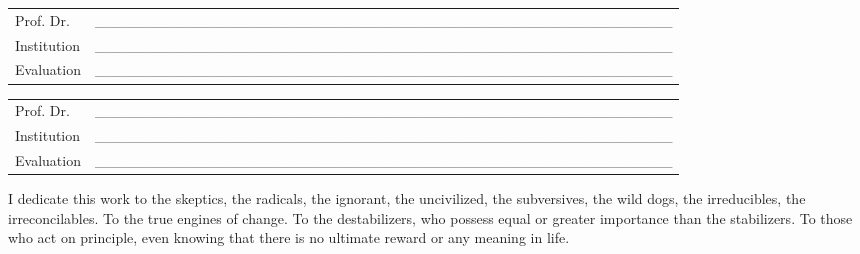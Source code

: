 \documentclass[
  12pt,
  a4paper,
  oneside]{tesesusp}
\begin{document}
\begin{folhadeaprovacao}
  \vspace*{0.5cm}

  \noindent
  \begin{tabular}{m{2cm} P{14cm}}
    Prof. Dr. & \_\_\_\_\_\_\_\_\_\_\_\_\_\_\_\_\_\_\_\_\_\_\_\_\_\_\_\_\_\_\_\_\_\_\_\_\_\_\_\_\_\_\_\_\_\_\_\_\_\_\_\_\_\_\_ \\
    Institution & \_\_\_\_\_\_\_\_\_\_\_\_\_\_\_\_\_\_\_\_\_\_\_\_\_\_\_\_\_\_\_\_\_\_\_\_\_\_\_\_\_\_\_\_\_\_\_\_\_\_\_\_\_\_\_ \\
    Evaluation & \_\_\_\_\_\_\_\_\_\_\_\_\_\_\_\_\_\_\_\_\_\_\_\_\_\_\_\_\_\_\_\_\_\_\_\_\_\_\_\_\_\_\_\_\_\_\_\_\_\_\_\_\_\_\_ \\
  \end{tabular}

  \vspace*{0.5cm}

  \noindent
  \begin{tabular}{m{2cm} P{14cm}}
    Prof. Dr. & \_\_\_\_\_\_\_\_\_\_\_\_\_\_\_\_\_\_\_\_\_\_\_\_\_\_\_\_\_\_\_\_\_\_\_\_\_\_\_\_\_\_\_\_\_\_\_\_\_\_\_\_\_\_\_ \\
    Institution & \_\_\_\_\_\_\_\_\_\_\_\_\_\_\_\_\_\_\_\_\_\_\_\_\_\_\_\_\_\_\_\_\_\_\_\_\_\_\_\_\_\_\_\_\_\_\_\_\_\_\_\_\_\_\_ \\
    Evaluation & \_\_\_\_\_\_\_\_\_\_\_\_\_\_\_\_\_\_\_\_\_\_\_\_\_\_\_\_\_\_\_\_\_\_\_\_\_\_\_\_\_\_\_\_\_\_\_\_\_\_\_\_\_\_\_ \\
  \end{tabular}
\end{folhadeaprovacao}


\begin{dedicatoria}
  \vspace*{\fill}
  \centering
I dedicate this work to the skeptics, the radicals, the ignorant, the
uncivilized, the subversives, the wild dogs, the irreducibles, the
irreconcilables. To the true engines of change. To the destabilizers,
who possess equal or greater importance than the stabilizers. To those
who act on principle, even knowing that there is no ultimate reward or
any meaning in life.
	\vspace*{\fill}
\end{dedicatoria}
\end{document}
